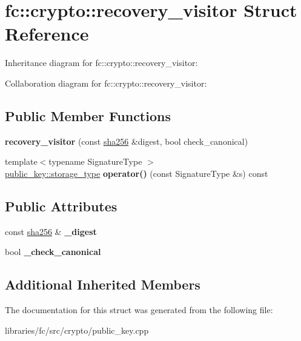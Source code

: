 \hypertarget{structfc_1_1crypto_1_1recovery__visitor}{}\section{fc\+:\+:crypto\+:\+:recovery\+\_\+visitor Struct Reference}
\label{structfc_1_1crypto_1_1recovery__visitor}


Inheritance diagram for fc\+:\+:crypto\+:\+:recovery\+\_\+visitor\+:


Collaboration diagram for fc\+:\+:crypto\+:\+:recovery\+\_\+visitor\+:
\subsection*{Public Member Functions}
\begin{DoxyCompactItemize}
\item 
\mbox{\label{structfc_1_1crypto_1_1recovery__visitor_a49b89582876d1cec42cc8783b48b5e30}} 
{\bfseries recovery\+\_\+visitor} (const \mbox{\hyperlink{classfc_1_1sha256}{sha256}} \&digest, bool check\+\_\+canonical)
\item 
\mbox{\label{structfc_1_1crypto_1_1recovery__visitor_adb077ad59be06f22bb8fe528635e004d}} 
{\footnotesize template$<$typename Signature\+Type $>$ }\\\mbox{\hyperlink{classfc_1_1static__variant}{public\+\_\+key\+::storage\+\_\+type}} {\bfseries operator()} (const Signature\+Type \&s) const
\end{DoxyCompactItemize}
\subsection*{Public Attributes}
\begin{DoxyCompactItemize}
\item 
\mbox{\label{structfc_1_1crypto_1_1recovery__visitor_a4c62df08e278eeed6ebf064093d829b1}} 
const \mbox{\hyperlink{classfc_1_1sha256}{sha256}} \& {\bfseries \+\_\+digest}
\item 
\mbox{\label{structfc_1_1crypto_1_1recovery__visitor_ab2caa9e08974fb6bae9e21dd2c82e112}} 
bool {\bfseries \+\_\+check\+\_\+canonical}
\end{DoxyCompactItemize}
\subsection*{Additional Inherited Members}


The documentation for this struct was generated from the following file\+:\begin{DoxyCompactItemize}
\item 
libraries/fc/src/crypto/public\+\_\+key.\+cpp\end{DoxyCompactItemize}
